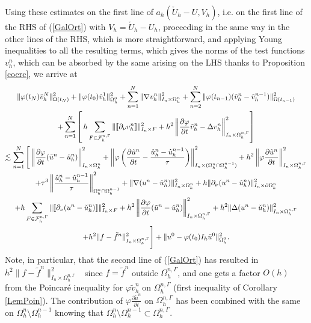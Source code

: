 \documentclass[11pt,a4paper]{article}
\theoremstyle{plain}
\theoremstyle{definition}
\theoremstyle{remark}
\numberwithin{equation}{section}
\begin{document}
Using these estimates on the first line of $a_h(\check{U}_h-U,V_h)$, i.e. on the first line of the RHS of (\ref{GalOrt}) with
$V_h = \check{U}_h - U_h$, proceeding in the same way in the other lines of the
RHS, which is more straightforward, and applying Young inequalities to all the
resulting terms, which gives the norms of the test functions $v_h^n$, which
can be absorbed by the same arising on the LHS thanks to Proposition \ref{coerc},
we arrive at
\begin{multline}\label{BeforeInterp}
	 \| \varphi (t_N) \tilde{v}_h^N \|_{\Omega (t_N)}^2 + \|
\varphi (t_0) \tilde{v}_h^1 \|_{\Omega^0_h}^2 + \sum_{n = 1}^N \| \nabla v^n_h
\|_{I_n \times \Omega_h^n}^2 + \sum_{n = 2}^N  \| \varphi (t_{n - 1})
(\tilde{v}_h^n - \tilde{v}_h^{n - 1}) \|_{\Omega (t_{n - 1})}^2
\\
+ \sum_{n = 1}^N \left[ \hspace{0.17em} h \sum_{F\in\mathcal{F}_h^{n, \Gamma}}  \| [\![\partial_\nu v^n_h]\!] \|_{I_n \times F}^2 + h^2  \left\|
\frac{\partial \varphi}{\partial t}  \tilde{v}^n_h - \Delta v^n_h \right\|_{I_n \times {\Omega_h^{n,\Gamma}}}^2 \right] \\
 \lesssim \sum_{n = 1}^N \Bigg[
   \left\| \frac{\partial \varphi}{\partial t} (\tilde{u}^n - \hat{u}_h^n) \right\|_{I_n \times \Omega_h^n}^2 +
\left\| \varphi \left( \frac{\partial \tilde{u}^n}{\partial t} -
\frac{{\hat{u}_h^n}  - \hat{u}_h^{n - 1}}{\tau} \right)  \right\|_{I_n \times (\Omega_h^n \cap \Omega_h^{n - 1})}^2
+ h^2 \left\| \varphi \frac{\partial \tilde{u}^n}{\partial t} \right\|_{I_n	\times {\Omega_h^{n,\Gamma}}}^2
\\
+ \tau^3 \left\| \frac{{\hat{u}_h^n}  - \hat{u}_h^{n - 1}}{\tau} \right\|_{\Omega_h^n\cap \Omega_h^{n - 1}}^2
+ \| \nabla (u^n - \check{u}^n_h)\|_{I_n \times \Omega_h^n}^2
+ h \|\partial_\nu ({u^n} - \check{u}^n_h)\|_{I_n \times \partial \Omega_h^n}^2 \\
+ h\sum_{F\in\mathcal{F}_h^{n, \Gamma}}  \| [\![\partial_\nu (u^n - \check{u}^n_h) ]\!] \|_{I_n \times F}^2
+ h^2  \left\| \frac{\partial\varphi}{\partial t} (\tilde{u}^n - \hat{u}^n_h) \right\|^2_{I_n \times{\Omega_h^{n,\Gamma}}}
+ h^2 \| \Delta (u^n - \check{u}^n_h) \|^2_{I_n \times {\Omega_h^{n,\Gamma}}} \\
+ h^2 \|f - \tilde{f}^n \|^2_{I_n	\times {\Omega_h^{n,\Gamma}}} \Bigg]
+ \| u^0 - \varphi  (t_0) I_h \tilde{u}^0 \|_{\Omega_h^0}^2.
\end{multline}
Note, in particular, that the second line of (\ref{GalOrt}) has resulted in
$h^2 \|f - \tilde{f}^n \|^2_{I_n \times {\Omega_h^{n,\Gamma}}}$ \ since $f =
\tilde{f}^n$ outside ${\Omega_h^{n,\Gamma}}$, and one gets a factor $O (h)$
from the Poincar{\'e} inequality for $\varphi \tilde{v}^n_h$ on
$\Omega_h^{n,\Gamma}$ {(first inequality of Corollary \ref{LemPoin})}. The contribution of $\varphi \frac{\partial
	\tilde{u}^n}{\partial t}$ on ${\Omega_h^{n,\Gamma}}$ has been combined
with the same on $\Omega_h^n \setminus \Omega_h^{n - 1}$ knowing that
$\Omega_h^n \setminus \Omega_h^{n - 1} \subset {\Omega_h^{n,\Gamma}}$.
\end{document}
